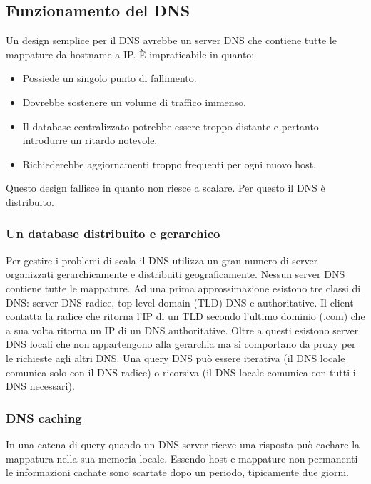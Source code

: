 \subsection{Funzionamento del DNS}
Un design semplice per il DNS avrebbe un server DNS che contiene tutte le mappature da hostname a IP. \`E impraticabile in quanto:
\begin{itemize}
\item Possiede un singolo punto di fallimento.
\item Dovrebbe sostenere un volume di traffico immenso.
\item Il database centralizzato potrebbe essere troppo distante e pertanto introdurre un ritardo notevole.
\item Richiederebbe aggiornamenti troppo frequenti per ogni nuovo host.
\end{itemize}
Questo design fallisce in quanto non riesce a scalare. Per questo il DNS \`e distribuito.
\subsubsection{Un database distribuito e gerarchico}
Per gestire i problemi di scala il DNS utilizza un gran numero di server organizzati gerarchicamente e distribuiti geograficamente. Nessun server DNS contiene tutte le mappature. Ad una prima 
approssimazione esistono tre classi di DNS: server DNS radice, top-level domain (TLD) DNS e authoritative. Il client contatta la radice che ritorna l'IP di un TLD secondo l'ultimo dominio (.com) che a sua volta
ritorna un IP di un DNS authoritative. Oltre a questi esistono server DNS locali che non appartengono alla gerarchia ma si comportano da proxy per le richieste agli altri DNS. Una query DNS pu\`o essere 
iterativa (il DNS locale comunica solo con il DNS radice) o ricorsiva (il DNS locale comunica con tutti i DNS necessari). 
\subsubsection{DNS caching}
In una catena di query quando un DNS server riceve una risposta pu\`o cachare la mappatura nella sua memoria locale. Essendo host e mappature non permanenti le informazioni cachate sono scartate dopo un
periodo, tipicamente due giorni. 
